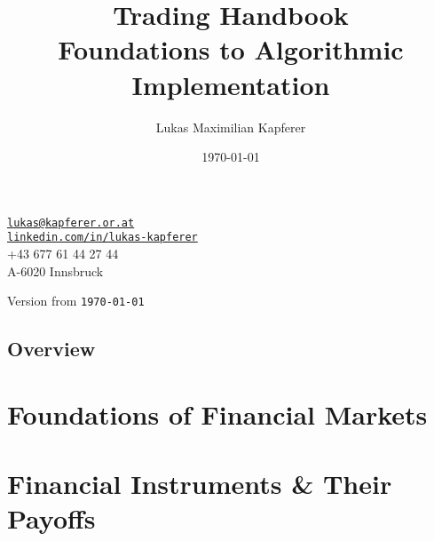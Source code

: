 \documentclass[a4paper, titlepage]{article} %
\title{Trading Handbook\\\large Foundations to Algorithmic Implementation}
\author{Lukas Maximilian Kapferer}
\date{\today}
\begin{document}
\frontmatter

\begin{titlepage}
    \centering
    \vspace*{3cm}
    {\LARGE \textbf{\thetitle} \par}
    \vspace{2cm}
    {\large \protect\theauthor\par}
    \vspace{0.5cm}
    \small
    \texttt{\href{mailto:lukas@kapferer.or.at}{lukas@kapferer.or.at}}\\
    \texttt{\href{https://www.linkedin.com/in/lukas-kapferer}{linkedin.com/in/lukas-kapferer}}\\
    +43 677 61 44 27 44\\
    A-6020 Innsbruck \par
    \vspace{0.5cm}
    Version from \texttt{\today}
\end{titlepage}

\tableofcontents
\chapter*{Overview}
\listoffigures  %
\listoftables   %
\printglossary[type=\acronymtype,title={List of Abbreviations}] %
\printglossary[title={Glossary of Terms}]                       %

\mainmatter

\part{Foundations of Financial Markets}\label{part:foundations}






\part{Financial Instruments \& Their Payoffs}\label{part:instruments}





\end{document}
